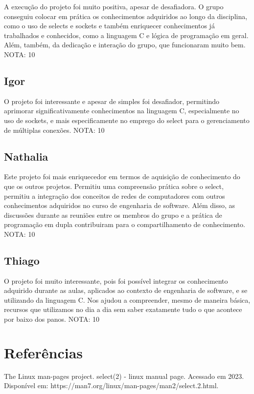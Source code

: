 \documentclass[a4paper]{article}
\begin{document}
A execução do projeto foi muito positiva, apesar de desafiadora. O grupo conseguiu colocar em prática os conhecimentos adquiridos ao longo da disciplina, como o uso de selects e sockets e também enriquecer conhecimentos já trabalhados e conhecidos, como a linguagem C e lógica de programação em geral. Além, também, da dedicação e interação do grupo, que funcionaram muito bem.
NOTA: 10

\subsection{Igor}

O projeto foi interessante e apesar de simples foi desafiador, permitindo aprimorar significativamente conhecimentos na linguagem C, especialmente no uso de sockets, e mais especificamente no emprego do select para o gerenciamento de múltiplas conexões.
NOTA: 10

\subsection{Nathalia}

Este projeto foi mais enriquecedor em termos de aquisição de conhecimento do que os outros projetos. Permitiu uma compreensão prática sobre o select, permitiu a integração dos conceitos de redes de computadores com outros conhecimentos adquiridos no curso de engenharia de software. Além disso, as discussões durante as reuniões entre os membros do grupo e a prática de programação em dupla contribuiram para o compartilhamento de conhecimento.
NOTA: 10

\subsection{Thiago}

O projeto foi muito interessante, pois foi possível integrar os conhecimento adquirido durante as aulas, aplicados ao contexto de engenharia de software, e se utilizando da linguagem C. Nos ajudou a compreender, mesmo de maneira básica, recursos que utilizamos no dia a dia sem saber exatamente tudo o que acontece por baixo dos panos. 
NOTA: 10

\section{Referências}

The Linux man-pages project. select(2) - linux manual page. Acessado em 2023.
Disponível em: https://man7.org/linux/man-pages/man2/select.2.html. 
\end{document}
